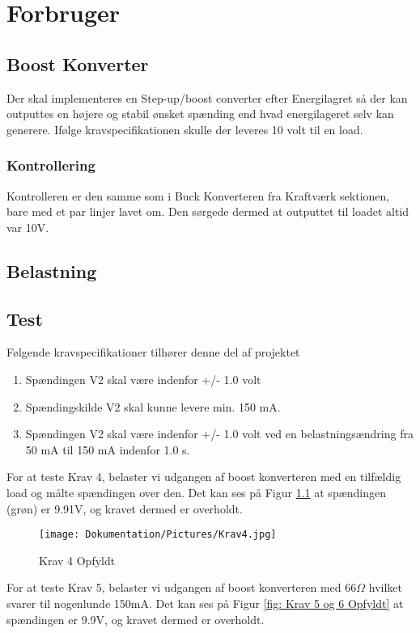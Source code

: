 \documentclass[../main.tex]{subfiles}
\begin{document}
\chapter{Forbruger} \label{Chap:Forbruger}

\section{Boost Konverter}
Der skal implementeres en Step-up/boost converter efter Energilagret så der kan outputtes en højere og stabil ønsket spænding end hvad energilageret selv kan generere. Ifølge kravspecifikationen skulle der leveres 10 volt til en load. 

\subsection{Kontrollering}
Kontrolleren er den samme som i Buck Konverteren fra Kraftværk sektionen, bare med et par linjer lavet om. Den sørgede dermed at outputtet til loadet altid var 10V.

\section{Belastning}

\section{Test}
Følgende kravspecifikationer tilhører denne del af projektet
\begin{enumerate}
  \item Spændingen V2 skal være indenfor +/- 1.0 volt
  \item Spændingskilde V2 skal kunne levere min. 150 mA.
  \item Spændingen V2 skal være indenfor +/- 1.0 volt ved en belastningsændring fra 50 mA til 150 mA indenfor 1.0 s.
\end{enumerate}

For at teste Krav 4, belaster vi udgangen af boost konverteren med en tilfældig load og målte spændingen over den. Det kan ses på Figur \ref{fig: Krav 4 Opfyldt} at spændingen (grøn) er 9.91V, og kravet dermed er overholdt.
\begin{figure}[H]
      \texttt{[image: Dokumentation/Pictures/Krav4.jpg]}
     \caption{Krav 4 Opfyldt}
     \label{fig: Krav 4 Opfyldt}
     \end{figure}

For at teste Krav 5, belaster vi udgangen af boost konverteren med 66$\Omega$ hvilket svarer til nogenlunde 150mA. Det kan ses på Figur \ref{fig: Krav 5 og 6 Opfyldt} at spændingen er 9.9V, og kravet dermed er overholdt.
\end{document}
